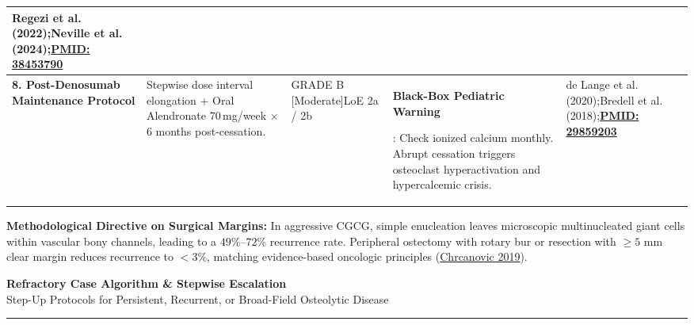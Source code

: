 \documentclass[9pt,a4paper]{article}
\newcommand{\hlr}[1]{\colorbox{hlred}{\strut\color{darkred}#1}}
\begin{document}
\begin{tabularx}{\linewidth}{>{\raggedright\arraybackslash}p{2.8cm} >{\raggedright\arraybackslash}p{3.8cm} >{\raggedright\arraybackslash}p{2.0cm} >{\raggedright\arraybackslash}p{5.1cm} >{\raggedright\arraybackslash}X}
Regezi et al. (2022);\newline Neville et al. (2024);\newline \href{https://pubmed.ncbi.nlm.nih.gov/38453790/}{\textbf{PMID: 38453790}} \\
\midrule
\textbf{8. Post-Denosumab Maintenance Protocol} &
Stepwise dose interval elongation + Oral Alendronate 70\,mg/week $\times$ 6 months post-cessation. &
GRADE B [Moderate]\newline LoE 2a / 2b &
\hlr{\textbf{Black-Box Pediatric Warning}}: Check ionized calcium monthly. Abrupt cessation triggers osteoclast hyperactivation and hypercalcemic crisis. &
de Lange et al. (2020);\newline Bredell et al. (2018);\newline \href{https://pubmed.ncbi.nlm.nih.gov/29859203/}{\textbf{PMID: 29859203}} \\
\bottomrule
\end{tabularx}

\vspace{5pt}
\textbf{Methodological Directive on Surgical Margins:} In aggressive CGCG, simple enucleation leaves microscopic multinucleated giant cells within vascular bony channels, leading to a $49\%\text{--}72\%$ recurrence rate. Peripheral ostectomy with rotary bur or resection with $\ge 5\text{ mm}$ clear margin reduces recurrence to $<3\%$, matching evidence-based oncologic principles (\href{https://pubmed.ncbi.nlm.nih.gov/31353534/}{Chrcanovic 2019}).

\clearpage

\begin{center}
{\Large\bfseries Refractory Case Algorithm \& Stepwise Escalation}\\[2pt]
{\small Step-Up Protocols for Persistent, Recurrent, or Broad-Field Osteolytic Disease}
\end{center}
\vspace{-4pt}
\hrule height 0.8pt
\vspace{5pt}
\end{document}
